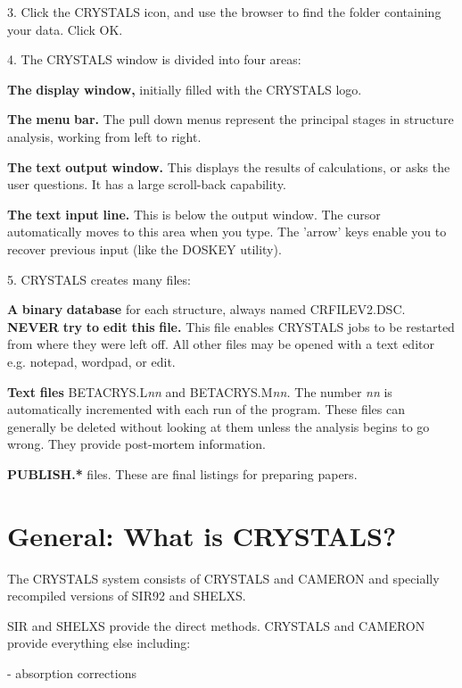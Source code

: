 \documentclass[10pt,a4paper]{report}
\begin{document}
3. Click the CRYSTALS icon, and use the browser to find the
folder containing your data. Click OK.



4. The CRYSTALS window is divided into four areas:


 {\bf The} {\bf display} {\bf window,} initially filled with the CRYSTALS logo.


 {\bf The} {\bf menu} {\bf bar.} The pull down menus represent the principal stages
in structure analysis, working from left to right.


 {\bf The} {\bf text} {\bf output} {\bf window.} This displays the results of
calculations, or asks the user questions. It has a large scroll-back
capability.


 {\bf The} {\bf text} {\bf input} {\bf line.} This is below the output window.
The cursor automatically moves to this area when you type. The 'arrow'
keys enable you to recover previous input (like the DOSKEY
utility).


5. CRYSTALS creates many files:


 {\bf A} {\bf binary} {\bf database} for each structure,
always named CRFILEV2.DSC. {\bf NEVER} {\bf try} {\bf to} {\bf edit} {\bf this} {\bf file.} This
file enables CRYSTALS jobs to be restarted from where they were left
off. All other files may be opened with a text editor e.g.
notepad, wordpad, or edit.


 {\bf Text} {\bf files} BETACRYS.L\emph{nn} and BETACRYS.M\emph{nn.} The number \emph{nn} is automatically
incremented with each run of the program. These files can generally be deleted without
looking at them unless the analysis begins to go wrong. They provide
post-mortem information.


 {\bf PUBLISH.*} files. These are final listings for preparing papers.




\section{General: What is CRYSTALS?}


The CRYSTALS system consists of CRYSTALS and CAMERON and specially recompiled
versions of SIR92 and SHELXS.


SIR and SHELXS provide the direct methods. CRYSTALS and CAMERON provide
everything else including:





- absorption corrections
\end{document}
